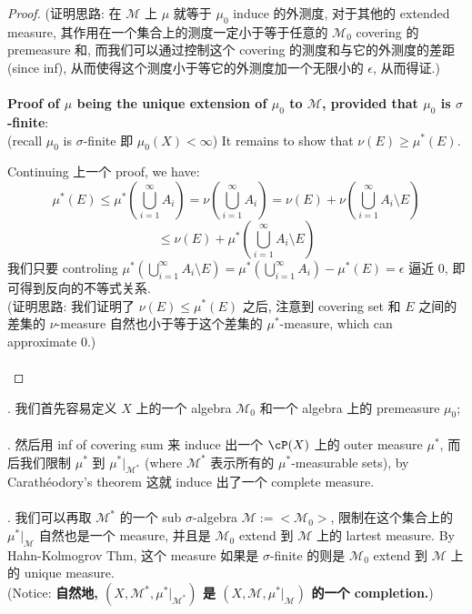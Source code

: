 \documentclass[lang=cn,11pt]{elegantbook}
\begin{document}
\begin{proof}
\noindent (证明思路: 在 $\mathcal{M}$ 上 $\mu$ 就等于 $\mu_0$ induce 的外测度, 对于其他的 extended measure, 其作用在一个集合上的测度一定小于等于任意的 $\mathcal{M}_0$ covering 的 premeasure 和, 而我们可以通过控制这个 covering 的测度和与它的外测度的差距(since inf), 从而使得这个测度小于等它的外测度加一个无限小的 $\epsilon$, 从而得证.) \\\\

\noindent \textbf{Proof of $\mu$ being the unique extension of $\mu_0$ to $\mathcal{M}$, provided that $\mu_0$ is $\sigma$-finite}:\\
\noindent (recall $\mu_0$ is $\sigma$-finite 即 $\mu_0(X) < \infty$) It remains to show that $\nu(E) \geq \mu^*(E)$.

\noindent Continuing 上一个 proof, we have:
$$
\mu^*(E) \leq \mu^*(\bigcup_{i=1}^\infty A_i) = \nu(\bigcup_{i=1}^\infty A_i) = \nu(E) + \nu(\bigcup_{i=1}^\infty A_i \setminus E)
$$
$$
\leq \nu(E) + \mu^*(\bigcup_{i=1}^\infty A_i \setminus E)
$$
我们只要 controling $\mu^*(\bigcup_{i=1}^\infty A_i \setminus E) = \mu^*(\bigcup_{i=1}^\infty A_i ) - \mu^*(E) = \epsilon $ 逼近 0, 即可得到反向的不等式关系.\\
\noindent (证明思路: 我们证明了 $\nu(E) \leq \mu^*(E)$ 之后, 注意到 covering set 和 $E$ 之间的差集的 $\nu$-measure 自然也小于等于这个差集的 $\mu^*$-measure, which can approximate 0.)
\\\\

\end{proof}


\begin{remark}
. 我们首先容易定义 $X$ 上的一个 algebra $\mathcal{M}_0$ 和一个 algebra 上的 premeasure $\mu_0$; \\\\
    . 然后用 inf of covering sum 来 induce 出一个 $\cP(X)$ 上的 outer measure $\mu^*$, 而后我们限制 $\mu^*$ 到 $\mu^*|_{\mathcal{M}^*}$ (where $\mathcal{M}^*$ 表示所有的 $\mu^*$-measurable sets), by Carathéodory's theorem 这就 induce 出了一个 complete measure. \\\\
    . 我们可以再取 $\mathcal{M}^*$ 的一个 sub $\sigma$-algebra $\mathcal{M} := <\mathcal{M}_0>$, 限制在这个集合上的 $\mu^*|_{\mathcal{M}}$ 自然也是一个 measure, 并且是 $\mathcal{M}_0$ extend 到 $\mathcal{M}$ 上的 lartest measure. By Hahn-Kolmogrov Thm, 这个 measure 如果是 $\sigma$-finite 的则是 $\mathcal{M}_0$ extend 到 $\mathcal{M}$ 上的 unique measure.\\
    \noindent (Notice: \textbf{自然地, $(X, \mathcal{M}^*, \mu^* |_{\mathcal{M}^*})$ 是 $(X, \mathcal{M}, \mu^*|_{\mathcal{M}})$ 的一个 completion.})
    
\end{remark}
\end{document}
